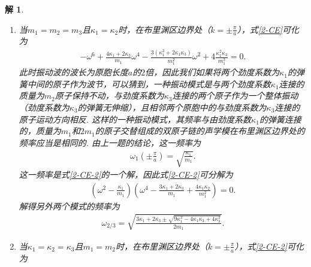 \documentclass[UTF8,10pt,a4paper]{article}
\theoremstyle{Problem}
\theoremstyle{Solution}
\newtheorem*{sol}{解}
\begin{document}
\begin{sol}
\begin{enumerate}
\begin{align}
        \end{align}
        \normalsize
        故两个光学模的频率分别为
        \scriptsize
        \begin{align}
            \omega_{\text{optical},1/2}=\sqrt{\frac{1}{2}\left[\left(\frac{\kappa_1+\kappa_2}{m_1}+\frac{\kappa_1+\kappa_2}{m_2}+\frac{\kappa_2+\kappa_3}{m_3}\right)\pm\sqrt{\left(\frac{\kappa_1+\kappa_2}{m_1}+\frac{\kappa_1+\kappa_2}{m_2}+\frac{\kappa_2+\kappa_3}{m_3}\right)^2-\frac{4(\kappa_1\kappa_2+\kappa_2\kappa_3+\kappa_3\kappa_1)(m_1+m_2+m_3)}{m_1m_2m_3}}\right]}.
        \end{align}
        \normalsize
        \item[(b)] 当$m_1=m_2=m_3$且$\kappa_1=\kappa_2$时，在布里渊区边界处（$k=\pm\frac{\pi}{a}$），式\eqref{2-CE}可化为
        \begin{align}
            \label{2-CE-2}
            -\omega^6+\frac{4\kappa_1+2\kappa_3}{m_1}\omega^4-\frac{3(\kappa_1^2+2\kappa_1\kappa_3)}{m_1^2}\omega^2+4\frac{\kappa_1^2\kappa_3}{m_1^3}=0.
        \end{align}
        此时振动波的波长为原胞长度$a$的$2$倍，因此我们如果将两个劲度系数为$\kappa_1$的弹簧中间的原子作为波节，可以猜到，一种振动模式是与两个劲度系数$\kappa_1$连接的质量为$m_2$原子保持不动，与劲度系数为$\kappa_3$连接的两个原子作为一个整体振动（劲度系数为$\kappa_3$的弹簧无伸缩），且相邻两个原胞中的与劲度系数为$\kappa_3$连接的原子运动方向相反. 这样的一种振动模式，其频率与由劲度系数$\kappa_1$的弹簧连接的，质量为$m_1$和$2m_1$的原子交替组成的双原子链的声学模在布里渊区边界处的频率应当是相同的. 由上一题的结论，这一频率为
        \begin{align}
            \omega_1(\pm\frac{\pi}{a})=\sqrt{\frac{\kappa_1}{m_1}}.
        \end{align}
        这一频率是式\eqref{2-CE-2}的一个解，因此式\eqref{2-CE-2}可分解为
        \begin{align}
            \left(\omega^2-\frac{\kappa_1}{m_1}\right)\left(\omega^4-\frac{3\kappa_1+2\kappa_3}{m_1}+\frac{4\kappa_1\kappa_2}{m_1^2}\right)=0.
        \end{align}
        解得另外两个模式的频率为
        \begin{align}
            \omega_{2/3}=\sqrt{\frac{3\kappa_1+2\kappa_3\pm\sqrt{9\kappa_1^2-4\kappa_1\kappa_3+4\kappa_3^2}}{2m_1}}.
        \end{align}
        \item[(c)] 当$\kappa_1=\kappa_2=\kappa_3$且$m_1=m_2$时，在布里渊区边界处（$k=\pm\frac{\pi}{a}$），式\eqref{2-CE-2}可化为

\end{enumerate}
\end{sol}
\end{document}

